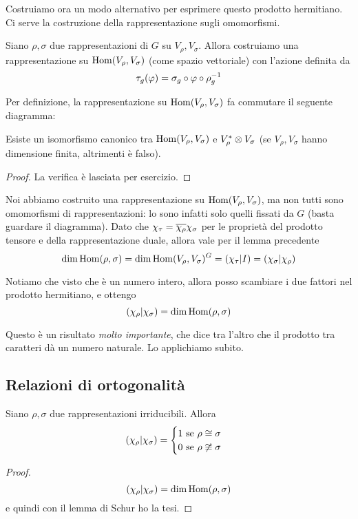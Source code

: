 Costruiamo ora un modo alternativo per esprimere questo prodotto hermitiano. Ci serve la costruzione della rappresentazione sugli omomorfismi.

\begin{mydef}
  Siano $\rho, \sigma$ due rappresentazioni di $G$ su $V_\rho,V_\sigma$. Allora costruiamo una rappresentazione su $\operatorname{Hom}(V_\rho,V_\sigma)$ (come spazio vettoriale) con l'azione definita da 
  \[
  \tau_g (\varphi) = \sigma_g \circ \varphi \circ \rho_g^{-1}
  \]
\end{mydef}

Per definizione, la rappresentazione su $\operatorname{Hom}(V_\rho,V_\sigma)$ fa commutare il seguente diagramma:
  

\begin{myprop}
  Esiste un isomorfismo canonico tra $\operatorname{Hom} (V_\rho,V_\sigma)$ e $V_\rho^* \otimes V_\sigma$ (se $V_\rho, V_\sigma$ hanno dimensione finita, altrimenti è falso).
\end{myprop}

\begin{proof}
  La verifica è lasciata per esercizio.
\end{proof}

Noi abbiamo costruito una rappresentazione su $\operatorname{Hom}(V_\rho,V_\sigma)$, ma non tutti sono omomorfismi di rappresentazioni: lo sono infatti solo quelli fissati da $G$ (basta guardare il diagramma). Dato che $\chi_\tau = \overline{\chi_\rho}\chi_\sigma$ per le proprietà del prodotto tensore e della rappresentazione duale, allora vale per il lemma precedente
\[
  \dim \operatorname{Hom}(\rho,\sigma) = \dim \operatorname{Hom}(V_\rho,V_\sigma)^G = \left(\chi_\tau | I\right) = \left(\chi_\sigma | \chi_\rho\right)
\]

Notiamo che visto che è un numero intero, allora posso scambiare i due fattori nel prodotto hermitiano, e ottengo
\[
  \left(\chi_\rho | \chi_\sigma\right) = \dim \operatorname{Hom}(\rho,\sigma)
\]

Questo è un risultato \emph{molto importante}, che dice tra l'altro che il prodotto tra caratteri dà un numero naturale. Lo applichiamo subito.





\subsection{Relazioni di ortogonalità}
\begin{mytheorem}
  Siano $\rho,\sigma$ due rappresentazioni irriducibili. Allora
  \[
  \left(\chi_\rho | \chi_\sigma\right) = \begin{cases}
			1 \mbox{ se } \rho \cong \sigma \\
			0 \mbox{ se } \rho \not\cong \sigma
		      \end{cases}
  \]
\end{mytheorem}
\begin{proof}
  \[
  \left(\chi_\rho | \chi_\sigma\right)=\dim \operatorname{Hom}(\rho,\sigma)
  \]
  e quindi con il lemma di Schur ho la tesi.
\end{proof}

